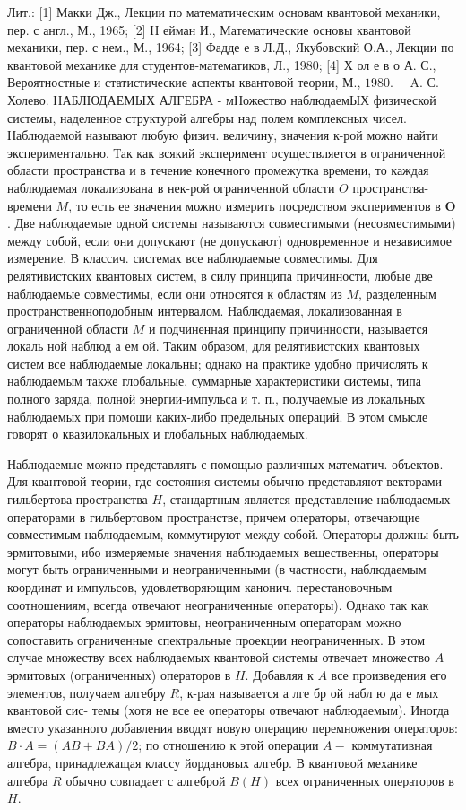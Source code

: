 \documentclass[10pt]{article}
\begin{document}
Лит.: [1] Макки Дж., Лекции по математическим основам квантовой механики, пер. с англ., М., 1965; [2] Н ейман И., Математические основы квантовой механики, пер. с нем., М., 1964; [3] Фадде е в Л.Д., Якубовский О.А., Лекции по квантовой механике для студентов-математиков, Л., 1980; [4] Х ол е в о А. С., Вероятностные и статистические аспекты квантовой теории, М., $1980 . \quad$ A. С. Холево. НАБЛЮДАЕМЫХ АЛГЕБРА - мНожество наблюдаемЫХ физической системы, наделенное структурой алгебры над полем комплексных чисел. Наблюдаемой называют любую физич. величину, значения к-рой можно найти экспериментально. Так как всякий эксперимент осуществляется в ограниченной области пространства и в течение конечного промежутка времени, то каждая наблюдаемая локализована в нек-рой ограниченной области $O$ пространства-времени $M$, то есть ее значения можно измерить посредством экспериментов в $\boldsymbol{O}$. Две наблюдаемые одной системы называются совместимыми (несовместимыми) между собой, если они допускают (не допускают) одновременное и независимое измерение. В классич. системах все наблюдаемые совместимы. Для релятивистских квантовых систем, в силу принципа причинности, любые две наблюдаемые совместимы, если они относятся к областям из $M$, разделенным пространственноподобным интервалом. Наблюдаемая, локализованная в ограниченной области $M$ и подчиненная принципу причинности, называется локаль ной наблюд а ем ой. Таким образом, для релятивистских квантовых систем все наблюдаемые локальны; однако на практике удобно причислять к наблюдаемым также глобальные, суммарные характеристики системы, типа полного заряда, полной энергии-импульса и т. п., получаемые из локальных наблюдаемых при помоши каких-либо предельных операций. В этом смысле говорят о квазилокальных и глобальных наблюдаемых.



Наблюдаемые можно представлять с помощью различных математич. объектов. Для квантовой теории, где состояния системы обычно представляют векторами гильбертова пространства $H$, стандартным является представление наблюдаемых операторами в гильбертовом пространстве, причем операторы, отвечающие совместимым наблюдаемым, коммутируют между собой. Операторы должны быть эрмитовыми, ибо измеряемые значения наблюдаемых вещественны, операторы могут быть ограниченными и неограниченными (в частности, наблюдаемым координат и импульсов, удовлетворяющим канонич. перестановочным соотношениям, всегда отвечают неограниченные операторы). Однако так как операторы наблюдаемых эрмитовы, неограниченным операторам можно сопоставить ограниченные спектральные проекции неограниченных. В этом случае множеству всех наблюдаемых квантовой системы отвечает множество $A$ эрмитовых (ограниченных) операторов в $H$. Добавляя к $A$ все произведения его элементов, получаем алгебру $R$, к-рая называется а лге бр ой набл ю да е мых квантовой сис- темы (хотя не все ее операторы отвечают наблюдаемым). Иногда вместо указанного добавления вводят новую операцию перемножения операторов: $B \cdot A=(A B+B A) / 2$; по отношению к этой операции $A-$ коммутативная алгебра, принадлежащая классу йордановых алгебр. В квантовой механике алгебра $R$ обычно совпадает с алгеброй $B(H)$ всех ограниченных операторов в $H$.
\end{document}
